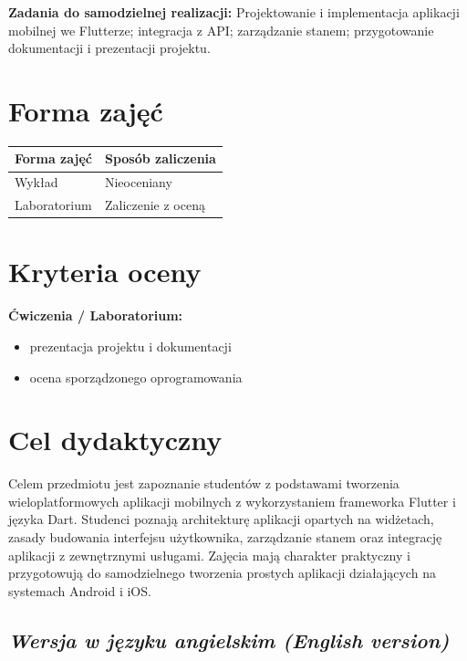 \documentclass[12pt, a4paper]{article}
\newcommand{\thdrule}{\noalign{\global\setlength{\extrarowheight}{0pt}}}
\newcommand{\thdend}{\noalign{\global\setlength{\extrarowheight}{3pt}}}
\begin{document}
\vspace{4pt}
\noindent\textbf{Zadania do samodzielnej realizacji:} Projektowanie i implementacja aplikacji mobilnej we Flutterze; integracja z API; zarządzanie stanem; przygotowanie dokumentacji i prezentacji projektu.

\section{Forma zajęć}

\begin{center}
{\scriptsize
\begin{tabular}{m{5cm}m{8cm}}
\thdrule\toprule
\rowcolor{pjatkRed} {\color{white}\textbf{Forma zajęć}} & {\color{white}\textbf{Sposób zaliczenia}} \\
\midrule\thdend
  \rowcolor{tableRowLight} Wykład & Nieoceniany \\
  \rowcolor{tableRowAlt} Laboratorium & Zaliczenie z oceną \\
\bottomrule
\end{tabular}}
\end{center}

\section{Kryteria oceny}

\textbf{Ćwiczenia / Laboratorium:}
\begin{itemize}
  \item prezentacja projektu i dokumentacji
  \item ocena sporządzonego oprogramowania
\end{itemize}


\section{Cel dydaktyczny}

Celem przedmiotu jest zapoznanie studentów z podstawami tworzenia wieloplatformowych aplikacji mobilnych z wykorzystaniem frameworka Flutter i języka Dart. Studenci poznają architekturę aplikacji opartych na widżetach, zasady budowania interfejsu użytkownika, zarządzanie stanem oraz integrację aplikacji z zewnętrznymi usługami. Zajęcia mają charakter praktyczny i przygotowują do samodzielnego tworzenia prostych aplikacji działających na systemach Android i iOS.

\subsection*{\textit{Wersja w języku angielskim (English version)}}
\end{document}
